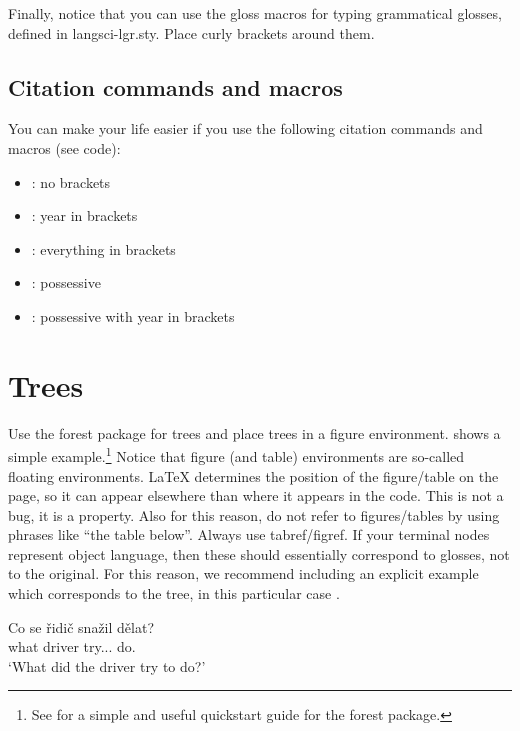 \noindent Finally, notice that you can use the gloss macros for typing grammatical glosses, defined in langsci-lgr.sty. Place curly brackets around them.

\subsection{Citation commands and macros}

You can make your life easier if you use the following citation commands and macros (see code):

\begin{itemize}
    \item \citealt{Bailyn2004}: no brackets
    \item \citet{Bailyn2004}: year in brackets
    \item \citep{Bailyn2004}: everything in brackets
    \item {}: possessive
    \item {}: possessive with year in brackets
\end{itemize}

\section{Trees}\label{s:tree}

Use the forest package for trees and place trees in a figure environment.  shows a simple example.\footnote{See \citet{VandenWyngaerd2017} for a simple and useful quickstart guide for the forest package.} Notice that figure (and table) environments are so-called floating environments. {\LaTeX} determines the position of the figure/table on the page, so it can appear elsewhere than where it appears in the code. This is not a bug, it is a property. Also for this reason, do not refer to figures/tables by using phrases like ``the table below''. Always use tabref/figref. If your terminal nodes represent object language, then these should essentially correspond to glosses, not to the original. For this reason, we recommend including an explicit example which corresponds to the tree, in this particular case .

\ea\label{sim:ex:czech-for-tree}\gll Co se řidič snažil dělat?\\
what {\REFL} driver try.{\PTCP.\SG.\MASC} do.{\INF}\\
\glt `What did the driver try to do?'
\z


